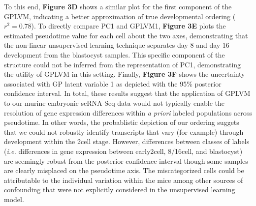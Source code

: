 \documentclass[english, 11pt]{article}\usepackage[]{graphicx}\usepackage[]{color}
\begin{document}
To this end, \textbf{Figure 3D} shows a similar plot for the first component of the GPLVM, indicating a better approximation of true developmental ordering ($r^2 = 0.78$). To directly compare PC1 and GPLVM1, \textbf{Figure 3E} plots the estimated pseudotime value for each cell about the two axes, demonstrating that the non-linear unsupervised learning technique separates day 8 and day 16 development from the blastocyst samples. This specific component of the structure could not be inferred from the representation of PC1, demonstrating the utility of GPLVM in this setting. Finally, \textbf{Figure 3F} shows the uncertainty associated with GP latent variable 1 as depicted with the 95\% posterior confidence interval. In total, these results suggest that the application of GPLVM to our murine embryonic scRNA-Seq data would not typically enable the resolution of gene expression differences within \textit{a priori} labeled populations across pseudotime. In other words, the probablistic depiction of our ordering suggets that we could not robustly identify transcripts that vary (for example) through development within the 2cell stage. However, differences between classes of labels (\textit{i.e.} differences in gene expression between early2cell, 8/16cell, and blastocyst) are seemingly robust from the posterior confidence interval though some samples are clearly misplaced on the pseudotime axis. The miscategorized cells could be attributable to the individual variation within the mice among other sources of confounding that were not explicitly considered in the unsupervised learning model. 
\end{document}
